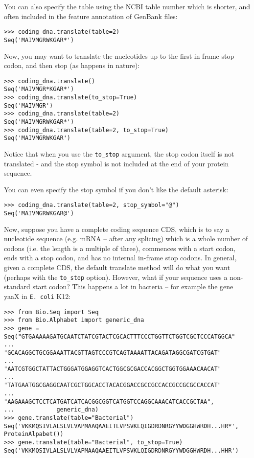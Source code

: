 You can also specify the table using the NCBI table number which is shorter, and often included in the feature annotation of GenBank files:

\begin{verbatim}
>>> coding_dna.translate(table=2)
Seq('MAIVMGRWKGAR*')
\end{verbatim}

Now, you may want to translate the nucleotides up to the first in frame stop codon,
and then stop (as happens in nature):

\begin{verbatim}
>>> coding_dna.translate()
Seq('MAIVMGR*KGAR*')
>>> coding_dna.translate(to_stop=True)
Seq('MAIVMGR')
>>> coding_dna.translate(table=2)
Seq('MAIVMGRWKGAR*')
>>> coding_dna.translate(table=2, to_stop=True)
Seq('MAIVMGRWKGAR')
\end{verbatim}
\noindent Notice that when you use the \verb|to_stop| argument, the stop codon itself
is not translated - and the stop symbol is not included at the end of your protein
sequence.

You can even specify the stop symbol if you don't like the default asterisk:

\begin{verbatim}
>>> coding_dna.translate(table=2, stop_symbol="@")
Seq('MAIVMGRWKGAR@')
\end{verbatim}

Now, suppose you have a complete coding sequence CDS, which is to say a
nucleotide sequence (e.g. mRNA -- after any splicing) which is a whole number
of codons (i.e. the length is a multiple of three), commences with a start
codon, ends with a stop codon, and has no internal in-frame stop codons.
In general, given a complete CDS, the default translate method will do what
you want (perhaps with the \verb|to_stop| option). However, what if your
sequence uses a non-standard start codon? This happens a lot in bacteria --
for example the gene yaaX in \texttt{E. coli} K12:

\begin{verbatim}
>>> from Bio.Seq import Seq
>>> from Bio.Alphabet import generic_dna
>>> gene = Seq("GTGAAAAAGATGCAATCTATCGTACTCGCACTTTCCCTGGTTCTGGTCGCTCCCATGGCA"
...            "GCACAGGCTGCGGAAATTACGTTAGTCCCGTCAGTAAAATTACAGATAGGCGATCGTGAT"
...            "AATCGTGGCTATTACTGGGATGGAGGTCACTGGCGCGACCACGGCTGGTGGAAACAACAT"
...            "TATGAATGGCGAGGCAATCGCTGGCACCTACACGGACCGCCGCCACCGCCGCGCCACCAT"
...            "AAGAAAGCTCCTCATGATCATCACGGCGGTCATGGTCCAGGCAAACATCACCGCTAA",
...            generic_dna)
>>> gene.translate(table="Bacterial")
Seq('VKKMQSIVLALSLVLVAPMAAQAAEITLVPSVKLQIGDRDNRGYYWDGGHWRDH...HR*',
ProteinAlpabet())
>>> gene.translate(table="Bacterial", to_stop=True)
Seq('VKKMQSIVLALSLVLVAPMAAQAAEITLVPSVKLQIGDRDNRGYYWDGGHWRDH...HHR')
\end{verbatim}

